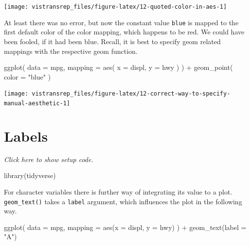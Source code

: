 \documentclass[]{book}
\newenvironment{Shaded}{}{}
\newcommand{\DataTypeTok}[1]{#1}
\newcommand{\KeywordTok}[1]{\textcolor[rgb]{0.00,0.00,1.00}{#1}}
\newcommand{\NormalTok}[1]{#1}
\newcommand{\OperatorTok}[1]{#1}
\newcommand{\StringTok}[1]{\textcolor[rgb]{0.00,0.50,0.50}{#1}}
\begin{document}
\begin{flushright}\texttt{[image: vistransrep\_files/figure-latex/12-quoted-color-in-aes-1]} \end{flushright}

At least there was no error, but now the constant value \texttt{blue} is mapped to the first default color of the color mapping, which happens to be red.
We could have been fooled, if it had been blue.
Recall, it is best to specify geom related mappings with the respective geom function.

\begin{Shaded}
\begin{Highlighting}[]
\KeywordTok{ggplot}\NormalTok{(}
  \DataTypeTok{data =}\NormalTok{ mpg,}
  \DataTypeTok{mapping =} \KeywordTok{aes}\NormalTok{(}
    \DataTypeTok{x =}\NormalTok{ displ,}
    \DataTypeTok{y =}\NormalTok{ hwy}
\NormalTok{  )}
\NormalTok{) }\OperatorTok{+}
\StringTok{  }\KeywordTok{geom_point}\NormalTok{(}
    \DataTypeTok{color =} \StringTok{"blue"}
\NormalTok{  )}
\end{Highlighting}
\end{Shaded}

\begin{flushright}\texttt{[image: vistransrep\_files/figure-latex/12-correct-way-to-specify-manual-aesthetic-1]} \end{flushright}

\hypertarget{labels}{%
\section{Labels}\label{labels}}

\emph{Click here to show setup code.}

\begin{Shaded}
\begin{Highlighting}[]
\KeywordTok{library}\NormalTok{(tidyverse)}
\end{Highlighting}
\end{Shaded}

For character variables there is further way of integrating its value to a plot.
\texttt{geom\_text()} takes a \texttt{label} argument, which influences the plot in the following way.

\begin{Shaded}
\begin{Highlighting}[]
\KeywordTok{ggplot}\NormalTok{(}
  \DataTypeTok{data =}\NormalTok{ mpg,}
  \DataTypeTok{mapping =} \KeywordTok{aes}\NormalTok{(}\DataTypeTok{x =}\NormalTok{ displ, }\DataTypeTok{y =}\NormalTok{ hwy)}
\NormalTok{) }\OperatorTok{+}
\StringTok{  }\KeywordTok{geom_text}\NormalTok{(}\DataTypeTok{label =} \StringTok{"A"}\NormalTok{)}
\end{Highlighting}
\end{Shaded}
\end{document}
